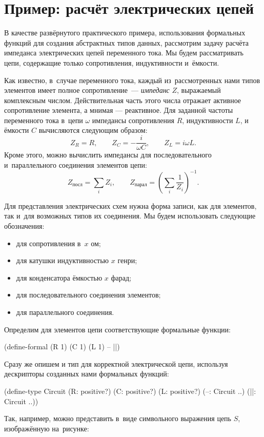 
\section{Пример: расчёт электрических цепей}%
В качестве развёрнутого практического примера, использования формальных функций для создания абстрактных типов данных, рассмотрим задачу расчёта импеданса электрических цепей переменного тока. Мы будем рассматривать цепи, содержащие только сопротивления, индуктивности и~ёмкости.

Как известно, в~случае переменного тока, каждый из~рассмотренных нами типов элементов имеет полное сопротивление~--- \emph{импеданс} $Z$, выражаемый комплексным числом. Действительная часть этого числа отражает активное сопротивление элемента, а мнимая --- реактивное. Для заданной частоты переменного тока в~цепи $\omega$ импедансы сопротивления $R$, индуктивности $L$, и ёмкости $C$ вычисляются следующим образом:
$$Z_R = R,\qquad Z_C = -\frac{i}{\omega C},\qquad Z_L = i\omega L.$$
Кроме этого, можно вычислить импедансы для последовательного и~параллельного соединения элементов цепи:
$$Z_\text{посл} = \sum\limits_i Z_i,\qquad  Z_\text{парал}= \left(\sum\limits_i\frac1{Z_i}\right)^{-1}.$$

Для представления электрических схем нужна форма записи, как для элементов, так и~для возможных типов их соединения. Мы будем использовать следующие обозначения:

\begin{itemize}
 \item[]  для сопротивления в~$x$ ом;

 \item[]  для катушки индуктивностью $x$ генри;

 \item[]  для конденсатора ёмкостью $x$ фарад;

 \item[]  для последовательного соединения элементов;

 \item[]  для параллельного соединения.
\end{itemize}

Определим для элементов цепи соответствующие формальные функции:
\begin{Definition}
(define-formal 
  (R 1) (C 1) (L 1) -- ||)
\end{Definition}
\noindent Сразу же опишем и тип для корректной электрической цепи, используя дескрипторы созданных нами формальных функций:
\begin{Definition}
(define-type Circuit
  (R: positive?)
  (C: positive?)
  (L: positive?)
  (--: Circuit ..)
  (||: Circuit ..))
\end{Definition}
Так, например, можно представить в~виде символьного выражения цепь $S$, изображённую на~рисунке:

